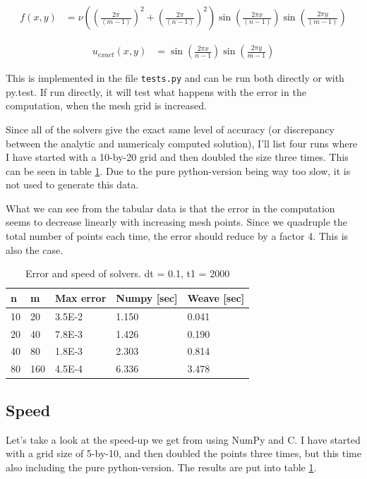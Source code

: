 \documentclass[a4paper]{article}
\begin{document}
\begin{align}
f(x,y) &= \nu\left(\left(\frac{2\pi}{(m-1)}\right)^2 + \left(\frac{2\pi}{(n-1)}\right)^2\right)\sin\left(\frac{2\pi x}{(n-1)}\right)\sin\left(\frac{2\pi y}{(m-1)}\right)
\end{align}

\begin{align}
u_{exact}(x,y) &= \sin\left(\frac{2\pi x}{n-1}\right)\sin\left(\frac{2\pi y}{m-1}\right)
\end{align}

This is implemented in the file \texttt{tests.py} and can be run both directly or with py.test. If run directly, it will test what happens with the error in the computation, when the mesh grid is increased.
\newline

Since all of the solvers give the exact same level of accuracy (or discrepancy between the analytic and numericaly computed solution), I'll list four runs where I have started with a 10-by-20 grid and then doubled the size three times. This can be seen in table \ref{TAB:test}. Due to the pure python-version being way too slow, it is not used to generate this data.

What we can see from the tabular data is that the error in the computation seems to decrease linearly with increasing mesh points. Since we quadruple the total number of points each time, the error should reduce by a factor 4. This is also the case. 

\begin{table}[ht]
\centering
\begin{tabular}{|l|l|l|l|l|}
\hline
\textbf{n} & \textbf{m} & \textbf{Max error} & \textbf{Numpy {[}sec{]}} & \textbf{Weave {[}sec{]}} \\ \hline
10 & 20 & 3.5E-2 & 1.150 & 0.041 \\ \hline
20 & 40 & 7.8E-3 & 1.426 & 0.190 \\ \hline
40 & 80 & 1.8E-3 & 2.303 & 0.814 \\ \hline
80 & 160 & 4.5E-4 & 6.336 & 3.478 \\ \hline
\end{tabular}
\caption{Error and speed of solvers. dt = 0.1, t1 = 2000\label{TAB:test}}
\end{table}

\subsection*{Speed}
Let's take a look at the speed-up we get from using NumPy and C. I have started with a grid size of 5-by-10, and then doubled the points three times, but this time also including the pure python-version. The results are put into table \ref{TAB:test}.
\end{document}
